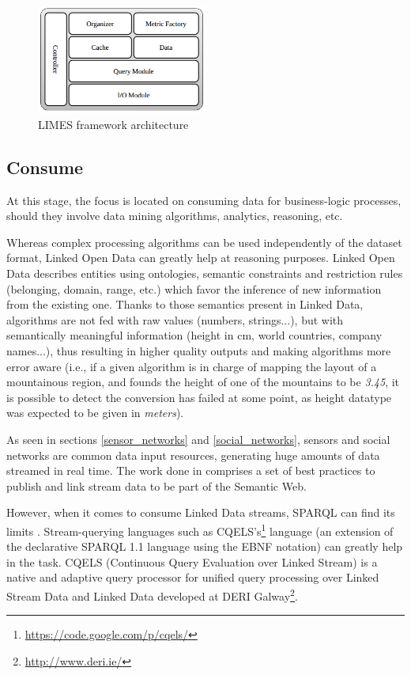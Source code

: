\begin{figure}
    \center
    \includegraphics[width=0.5\textwidth]{img/ld_approach/limes.png}
    \caption{LIMES framework architecture}
\end{figure}

\subsection{Consume}
\label{subsec:consume}

At this stage, the focus is located on consuming data for business-logic processes, should they involve data mining algorithms, analytics, reasoning, etc.

Whereas complex processing algorithms can be used independently of the dataset format, Linked Open Data can greatly help at reasoning purposes. Linked Open Data describes entities using ontologies, semantic constraints and restriction rules (belonging, domain, range, etc.) which favor the inference of new information from the existing one. Thanks to those semantics present in Linked Data, algorithms are not fed with raw values (numbers, strings...), but with semantically meaningful information (height in cm, world countries, company names...), thus resulting in higher quality outputs and making algorithms more error aware (i.e., if a given algorithm is in charge of mapping the layout of a mountainous region, and founds the height of one of the mountains to be \textit{3.45}, it is possible to detect the conversion has failed at some point, as height datatype was expected to be given in \textit{meters}).

As seen in sections \ref{sensor_networks} and \ref{social_networks}, sensors and social networks are common data input resources, generating huge amounts of data streamed in real time. The work done in \cite{sequeda2009linked} comprises a set of best practices to publish and link stream data to be part of the Semantic Web.

However, when it comes to consume Linked Data streams, SPARQL can find its limits \cite{della2009s}. Stream-querying languages such as CQELS's\footnote{\url{https://code.google.com/p/cqels/}} language (an extension of the declarative SPARQL 1.1 language using the EBNF notation) can greatly help in the task. CQELS\cite{le2011native} (Continuous Query Evaluation over Linked Stream) is a native and adaptive query processor for unified query processing over Linked Stream Data and Linked Data developed at DERI Galway\footnote{\url{http://www.deri.ie/}}.

